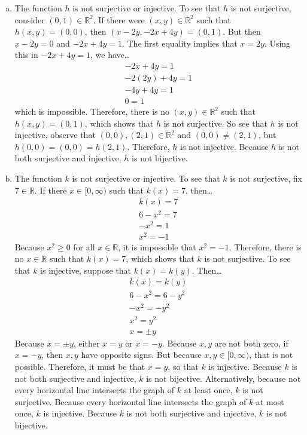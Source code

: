 \documentclass[11pt,letterpaper]{article}
\begin{document}
\begin{enumerate}[(a)]
\item The function $h$ is not surjective or injective. To see that $h$ is not surjective, consider $(0, 1) \in \mathbb{R}^2$. If there were $(x, y) \in \mathbb{R}^2$ such that $h(x, y)= (0, 0)$, then $(x - 2y, -2x + 4y)= (0, 1)$. But then $x - 2y= 0$ and $-2x + 4y= 1$. The first equality implies that $x= 2y$. Using this in $-2x + 4y= 1$, we have\dots
	\[
	\begin{gathered}
	-2x + 4y= 1 \\
	-2(2y) + 4y= 1 \\
	-4y + 4y= 1 \\
	0= 1
	\end{gathered}
	\]
which is impossible. Therefore, there is no $(x, y) \in \mathbb{R}^2$ such that $h(x, y)= (0, 1)$, which shows that $h$ is not surjective. So see that $h$ is not injective, observe that $(0, 0), (2, 1) \in \mathbb{R}^2$ and $(0, 0) \neq (2, 1)$, but $h(0, 0)= (0, 0)= h(2, 1)$. Therefore, $h$ is not injective. Because $h$ is not both surjective and injective, $h$ is not bijective. \pspace

\item The function $k$ is not surjective or injective. To see that $k$ is not surjective, fix $7 \in \mathbb{R}$. If there $x \in [0, \infty)$ such that $k(x)= 7$, then\dots
	\[
	\begin{gathered}
	k(x)= 7 \\
	6 - x^2= 7 \\
	-x^2= 1 \\
	x^2= -1
	\end{gathered}
	\]
Because $x^2 \geq 0$ for all $x \in \mathbb{R}$, it is impossible that $x^2= -1$. Therefore, there is no $x \in \mathbb{R}$ such that $k(x)= 7$, which shows that $k$ is not surjective. To see that $k$ is injective, suppose that $k(x)= k(y)$. Then\dots
	\[
	\begin{gathered}
	k(x)= k(y) \\
	6 - x^2= 6 - y^2 \\
	-x^2= -y^2 \\
	x^2= y^2 \\
	x= \pm y
	\end{gathered}
	\]
Because $x= \pm y$, either $x= y$ or $x= -y$. Because $x, y$ are not both zero, if $x= -y$, then $x, y$ have opposite signs. But because $x, y \in [0, \infty)$, that is not possible. Therefore, it must be that $x= y$, so that $k$ is injective. Because $k$ is not both surjective and injective, $k$ is not bijective. Alternatively, because not every horizontal line intersects the graph of $k$ at least once, $k$ is not surjective. Because every horizontal line intersects the graph of $k$ at most once, $k$ is injective. Because $k$ is not both surjective and injective, $k$ is not bijective.  
\end{enumerate}
\end{document}
